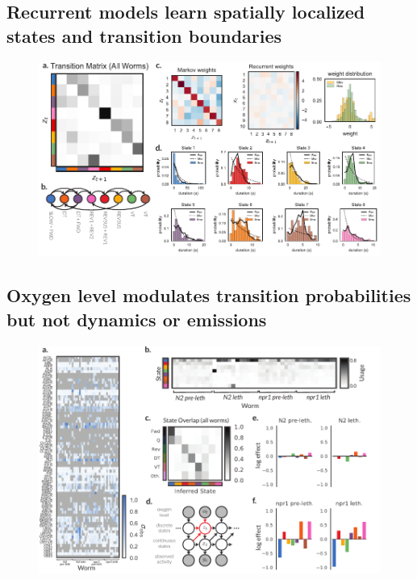 \documentclass[11pt]{article}
\begin{document}
\subsection*{Recurrent models learn spatially localized states and transition boundaries}

\begin{figure}[t]
\centering%
\includegraphics[width=6in]{figures/figure4} 
\caption{}
\label{fig:recurrent}
\end{figure}

\subsection*{Oxygen level modulates transition probabilities but not dynamics or emissions}

\begin{figure}[t]
\centering%
\includegraphics[width=6in]{figures/figure5} 
\caption{}
\label{fig:o2}
\end{figure}
\end{document}
